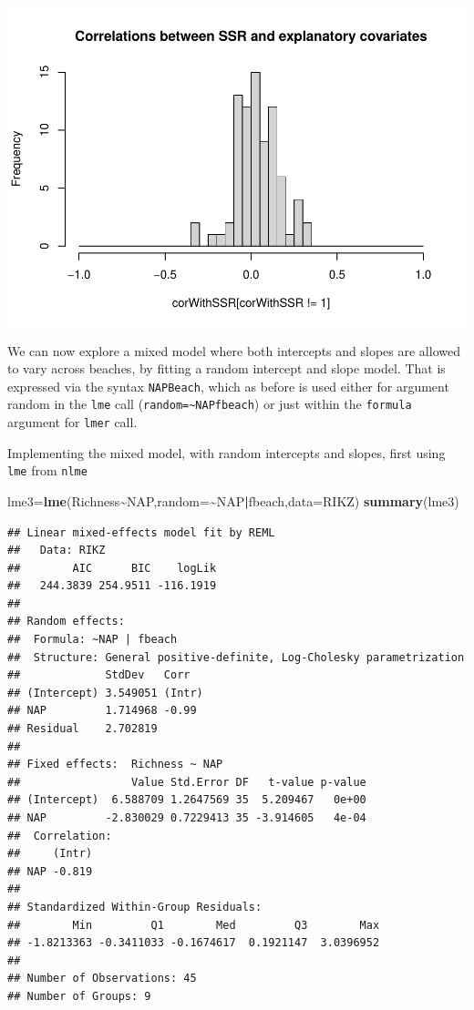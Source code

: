 \documentclass[
]{book}
\newenvironment{Shaded}{\begin{snugshade}}{\end{snugshade}}
\newcommand{\AttributeTok}[1]{\textcolor[rgb]{0.13,0.29,0.53}{#1}}
\newcommand{\FunctionTok}[1]{\textcolor[rgb]{0.13,0.29,0.53}{\textbf{#1}}}
\newcommand{\NormalTok}[1]{#1}
\newcommand{\OtherTok}[1]{\textcolor[rgb]{0.56,0.35,0.01}{#1}}
\newcommand{\SpecialCharTok}[1]{\textcolor[rgb]{0.81,0.36,0.00}{\textbf{#1}}}
\begin{document}
\includegraphics{ECOMODbook_files/figure-latex/unnamed-chunk-70-1.pdf}

We can now explore a mixed model where both intercepts and slopes are allowed to vary across beaches, by fitting a random intercept and slope model. That is expressed via the syntax \texttt{NAP\textbar{}Beach}, which as before is used either for argument random in the \texttt{lme} call (\texttt{random=\textasciitilde{}NAP\textbar{}fbeach}) or just within the \texttt{formula} argument for \texttt{lmer} call.

Implementing the mixed model, with random intercepts and slopes, first using \texttt{lme} from \texttt{nlme}

\begin{Shaded}
\begin{Highlighting}[]
\NormalTok{lme3}\OtherTok{=}\FunctionTok{lme}\NormalTok{(Richness}\SpecialCharTok{\textasciitilde{}}\NormalTok{NAP,}\AttributeTok{random=}\SpecialCharTok{\textasciitilde{}}\NormalTok{NAP}\SpecialCharTok{|}\NormalTok{fbeach,}\AttributeTok{data=}\NormalTok{RIKZ)}
\FunctionTok{summary}\NormalTok{(lme3)}
\end{Highlighting}
\end{Shaded}

\begin{verbatim}
## Linear mixed-effects model fit by REML
##   Data: RIKZ 
##        AIC      BIC    logLik
##   244.3839 254.9511 -116.1919
## 
## Random effects:
##  Formula: ~NAP | fbeach
##  Structure: General positive-definite, Log-Cholesky parametrization
##             StdDev   Corr  
## (Intercept) 3.549051 (Intr)
## NAP         1.714968 -0.99 
## Residual    2.702819       
## 
## Fixed effects:  Richness ~ NAP 
##                 Value Std.Error DF   t-value p-value
## (Intercept)  6.588709 1.2647569 35  5.209467   0e+00
## NAP         -2.830029 0.7229413 35 -3.914605   4e-04
##  Correlation: 
##     (Intr)
## NAP -0.819
## 
## Standardized Within-Group Residuals:
##        Min         Q1        Med         Q3        Max 
## -1.8213363 -0.3411033 -0.1674617  0.1921147  3.0396952 
## 
## Number of Observations: 45
## Number of Groups: 9
\end{verbatim}
\end{document}
